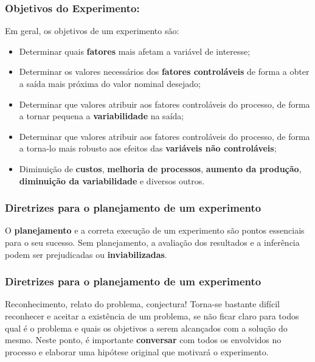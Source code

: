\documentclass[14pt,aspectratio=1610]{beamer}
\begin{document}
\begin{frame}{}
\frametitle{Objetivos do Experimento:}
\begin{block}{}
Em geral, os objetivos de um experimento são:
\begin{itemize}
    \item Determinar quais \textbf{fatores} mais afetam a variável de interesse;\pause
    \item Determinar os valores necessários dos \textbf{fatores controláveis} de forma a obter a saída mais próxima do valor nominal desejado;\pause
    \item Determinar que valores atribuir aos fatores controláveis do processo, de forma a tornar pequena a \textbf{variabilidade} na saída;\pause
    \item Determinar que valores atribuir aos fatores controláveis do processo, de forma a torna-lo mais robusto aos efeitos das \textbf{variáveis não controláveis};\pause
    \item Diminuição de \textbf{custos}, \textbf{melhoria de processos}, \textbf{aumento da produção}, \textbf{diminuição da variabilidade} e diversos outros.
\end{itemize}
\end{block}
\end{frame}

\begin{frame}{}
\frametitle{Diretrizes para o planejamento de um experimento}
\begin{block}{}
\justifying
O \textbf{planejamento} e a correta execução de um experimento são pontos essenciais para o seu sucesso. Sem planejamento, a avaliação dos resultados e a inferência 
podem ser prejudicadas ou \textbf{inviabilizadas}. 
\end{block}
\end{frame}

\begin{frame}{}
\frametitle{Diretrizes para o planejamento de um experimento}
\begin{block}{Reconhecimento, relato do problema, conjectura!}
\justifying
Torna-se bastante difícil reconhecer e aceitar a existência de um problema, se não ficar claro para todos qual é o problema e quais os objetivos a serem alcançados com 
a solução do mesmo. Neste ponto, é importante \textbf{conversar} com todos os envolvidos no processo e elaborar uma hipótese original que motivará o experimento.
\end{block}
\end{frame}
\end{document}
